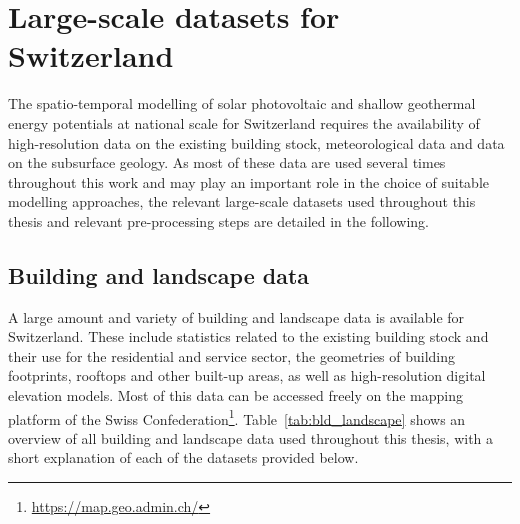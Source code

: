 \chapter{Large-scale datasets for Switzerland}
\label{data}


The spatio-temporal modelling of solar photovoltaic and shallow geothermal energy potentials at national scale for Switzerland requires the availability of high-resolution data on the existing building stock, meteorological data and data on the subsurface geology. 
As most of these data are used several times throughout this work and may play an important role in the choice of suitable modelling approaches, the relevant large-scale datasets used throughout this thesis and relevant pre-processing steps are detailed in the following.

\section{Building and landscape data}
A large amount and variety of building and landscape data is available for Switzerland. These include statistics related to the existing building stock and their use for the residential and service sector, the geometries of building footprints, rooftops and other built-up areas, as well as high-resolution digital elevation models. Most of this data can be accessed freely on the mapping platform of the Swiss Confederation\footnote{\url{https://map.geo.admin.ch/}}.  Table~\ref{tab:bld_landscape} shows an overview of all building and landscape data used throughout this thesis, with a short explanation of each of the datasets provided below.

